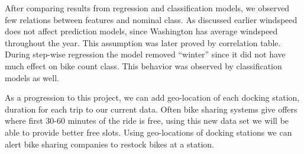 \documentclass[12pt]{article}
\newcommand{\bibfile}{GroupProject}
\begin{document}

After comparing results from regression and classification models, we observed
few relations between features and nominal class. As discussed earlier
windspeed does not affect prediction models, since Washington has average
windspeed throughout the year. This assumption was later proved by correlation
table. During step-wise regression the model removed ``winter'' since it did not
have much effect on bike count class. This behavior was observed by
classification models as well.



As a progression to this project, we can add geo-location of each docking
station, duration for each trip to our current data. Often bike sharing systems
give offers where first 30-60 minutes of the ride is free, using this new data
set we will be able to provide better free slots. Using geo-locations of
docking stations we can alert bike sharing companies to restock bikes at a
station.



\end{document}
